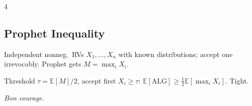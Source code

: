 \documentclass[8pt,a4paper,landscape]{extarticle}
\begin{document}
\begin{multicols*}{4}
\subsection{Prophet Inequality}
Independent nonneg.\ RVs $X_1,\ldots,X_n$ with known distributions; accept one irrevocably. Prophet gets $M=\max_i X_i$.
\begin{thm}
Threshold $\tau=\mathbb{E}[M]/2$, accept first $X_i\geq\tau$:
$\mathbb{E}[\text{ALG}]\geq\tfrac{1}{2}\mathbb{E}[\max_i X_i]$. Tight.
\end{thm}

\vfill
\begin{center}
\textit{Bon courage.}
\end{center}
\fi
\end{multicols*}
\end{document}

